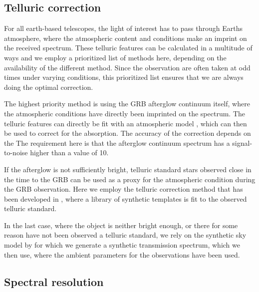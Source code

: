 \documentclass{aa}    %
\begin{document}
\subsection{Telluric correction} \label{tell_corr}

For all earth-based telescopes, the light of interest has to pass through Earths
atmosphere, where the atmospheric content and conditions make an imprint on the
received spectrum. These telluric features can be calculated in a multitude of
ways and we employ a prioritized list of methods here, depending on the
availability of the different method. Since the observation are often taken at
odd times under varying conditions, this prioritized list ensures that we are
always doing the optimal correction.

The highest priority method is using the GRB afterglow continuum itself, where
the atmospheric conditions have directly been imprinted on the spectrum. The
telluric features can directly be fit with an atmospheric model
\citep{Smette2015, Kausch2015}, which can then be used to correct for the absorption. The accuracy of the correction depends on the 
The requirement here is that the afterglow continuum spectrum has a
signal-to-noise higher than a value of 10.

If the afterglow is not sufficiently bright, telluric standard stars observed
close in the time to the GRB can be used as a proxy for the atmospheric
condition during the GRB observation. Here we employ the telluric correction
method that has been developed in \citet{Selsing2015}, where a library of
synthetic templates is fit to the observed telluric standard.

In the last case, where the object is neither bright enough, or there for some
reason have not been observed a telluric standard, we rely on the synthetic sky
model by \citep{Noll2012, Jones2013} for which we generate a synthetic
transmission spectrum, which we then use, where the ambient parameters for the
observations have been used.

\subsection{Spectral resolution} \label{resolution}
\end{document}
